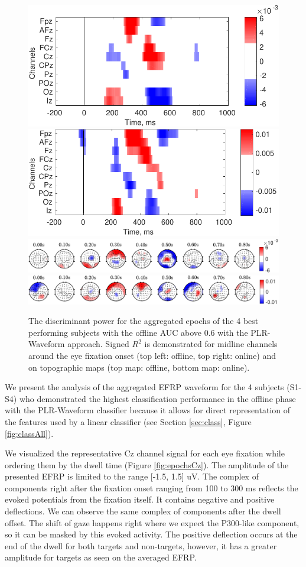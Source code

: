 \documentclass[12pt]{iopart}
\begin{document}
\begin{figure}[!t]
\center
    \includegraphics[trim={0cm 0.01cm 0cm 0cm},clip,width=0.45\columnwidth]{../images/SignR_offline.pdf}
    \includegraphics[trim={0cm 0cm 0cm 0.01cm},clip,width=0.45\columnwidth]{../images/SignR_online.pdf}
    \includegraphics[trim={0cm 0cm 0cm 0cm},clip,width=0.9\columnwidth]{../images/offline/TopoPlot_TLock-start_signRSquare_Saggregate_objrec_subjects_popuponline_s1.pdf}
    \includegraphics[trim={0cm 0cm 0cm 0cm},clip,width=0.9\columnwidth]{../images/online/TopoPlot_TLock-start_signRSquare_Saggregate_objrec_subjects_popuponline_s1.pdf}
    \caption{The discriminant power for the aggregated epochs of
        the 4 best performing subjects with the offline AUC above 0.6 with the PLR-Waveform approach.
    Signed $R^2$ is demonstrated for midline channels around the eye fixation onset
    (top left: offline, top right: online) and on topographic maps (top map: offline, bottom map: online).}
\label{fig:signR}
\end{figure}


We present the analysis of the aggregated EFRP waveform
for the 4 subjects (S1-S4) who demonstrated
the highest classification performance in the offline phase with the 
PLR-Waveform classifier because it allows for direct representation
of the features used by a linear classifier (see Section \ref{sec:class}, Figure \ref{fig:classAll}).

We visualized the representative Cz channel signal
for each eye fixation while ordering them
by the dwell time (Figure \ref{fig:epochsCz}).
The amplitude of the presented EFRP is limited to the range [-1.5, 1.5] uV.
The complex of components right after the fixation onset ranging from 100 to 300 ms
reflects the evoked potentials from the fixation itself. It contains
negative and positive deflections. We can observe the same complex of components
after the dwell offset. The shift of gaze happens right where we expect 
the P300-like component, so it can be masked by this evoked activity.
The positive deflection occurs at the end of the dwell for both
targets and non-targets, however, it has a greater amplitude for targets
as seen on the averaged EFRP.
\end{document}
